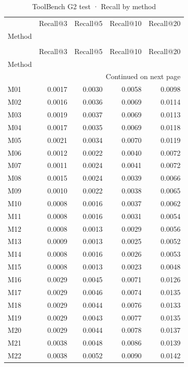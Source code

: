 \begin{longtable}{lrrrr}
\caption{ToolBench G2 test · Recall by method} \label{tab:ToolBench-G2-test-family-family-recall} \\
\toprule
 & Recall@3 & Recall@5 & Recall@10 & Recall@20 \\
Method &  &  &  &  \\
\midrule
\endfirsthead
\caption[]{ToolBench G2 test · Recall by method} \\
\toprule
 & Recall@3 & Recall@5 & Recall@10 & Recall@20 \\
Method &  &  &  &  \\
\midrule
\endhead
\midrule
\multicolumn{5}{r}{Continued on next page} \\
\midrule
\endfoot
\bottomrule
\endlastfoot
M01 & 0.0017 & 0.0030 & 0.0058 & 0.0098 \\
M02 & 0.0016 & 0.0036 & 0.0069 & 0.0114 \\
M03 & 0.0019 & 0.0037 & 0.0069 & 0.0113 \\
M04 & 0.0017 & 0.0035 & 0.0069 & 0.0118 \\
M05 & 0.0021 & 0.0034 & 0.0070 & 0.0119 \\
M06 & 0.0012 & 0.0022 & 0.0040 & 0.0072 \\
M07 & 0.0011 & 0.0024 & 0.0041 & 0.0072 \\
M08 & 0.0015 & 0.0024 & 0.0039 & 0.0066 \\
M09 & 0.0010 & 0.0022 & 0.0038 & 0.0065 \\
M10 & 0.0008 & 0.0016 & 0.0037 & 0.0062 \\
M11 & 0.0008 & 0.0016 & 0.0031 & 0.0054 \\
M12 & 0.0008 & 0.0013 & 0.0029 & 0.0056 \\
M13 & 0.0009 & 0.0013 & 0.0025 & 0.0052 \\
M14 & 0.0008 & 0.0016 & 0.0026 & 0.0053 \\
M15 & 0.0008 & 0.0013 & 0.0023 & 0.0048 \\
M16 & 0.0029 & 0.0045 & 0.0071 & 0.0126 \\
M17 & 0.0029 & 0.0046 & 0.0074 & 0.0135 \\
M18 & 0.0029 & 0.0044 & 0.0076 & 0.0133 \\
M19 & 0.0029 & 0.0043 & 0.0077 & 0.0135 \\
M20 & 0.0029 & 0.0044 & 0.0078 & 0.0137 \\
M21 & 0.0038 & 0.0048 & 0.0086 & 0.0139 \\
M22 & 0.0038 & 0.0052 & 0.0090 & 0.0142 \\

\end{longtable}
